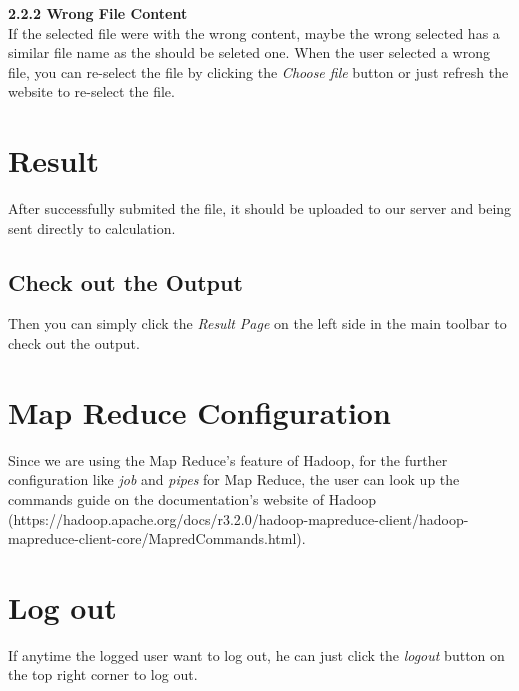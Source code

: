 \documentclass[runningheads]{llncs}
\begin{document}
\noindent
\textbf{2.2.2 Wrong File Content\\}
If the selected file were with the wrong content, maybe the wrong selected has a similar file name as the should be seleted one. When the user selected a wrong file, you can re-select the file by clicking the \textit{Choose file} button or just refresh the website to re-select the file.

\section{Result}
After successfully submited the file, it should be uploaded to our server and being sent directly to calculation. 

\subsection{Check out the Output}
Then you can simply click the \textit{Result Page} on the left side in the main toolbar to check out the output.

\section{Map Reduce Configuration}
Since we are using the Map Reduce's feature of Hadoop, for the further configuration like \textit{job} and \textit{pipes} for Map Reduce, the user can look up the commands guide on the documentation's website of Hadoop (https://hadoop.apache.org/docs/r3.2.0/hadoop-mapreduce-client/hadoop-mapreduce-client-core/MapredCommands.html).

\section{Log out}
If anytime the logged user want to log out, he can just click the \textit{logout} button on the top right corner to log out.
\end{document}
